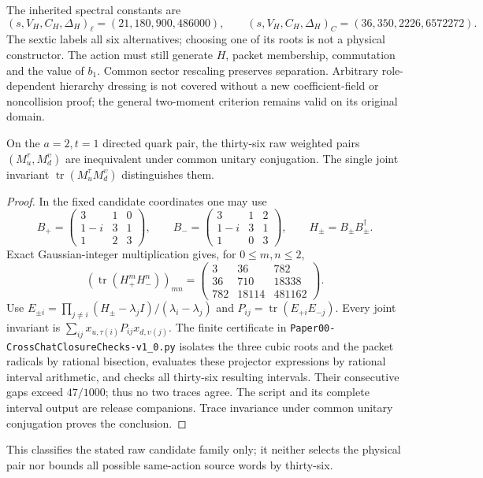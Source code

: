 \documentclass[11pt,a4paper]{article}
\begin{document}
The inherited spectral constants are
\[
 (s,V_H,C_H,\Delta_H)_\ell=(21,180,900,486000),\qquad
 (s,V_H,C_H,\Delta_H)_C=(36,350,2226,6572272).
\]
The sextic labels all six alternatives; choosing one of its roots is not a
physical constructor.  The action must still generate \(H\), packet
membership, commutation and the value of \(b_1\).  Common sector rescaling
preserves separation.  Arbitrary role-dependent hierarchy dressing is not
covered without a new coefficient-field or noncollision proof; the general
two-moment criterion remains valid on its original domain.

\begin{theorem}
\label{p6:thm:v2109-thirtysix-inequivalent}
On the \(a=2,t=1\) directed quark pair, the thirty-six raw weighted pairs
\((M_u^\tau,M_d^\upsilon)\) are inequivalent under common unitary
conjugation.  The single joint invariant
\(\operatorname{tr}(M_u^\tau M_d^\upsilon)\) distinguishes them.
\end{theorem}
\begin{proof}
In the fixed candidate coordinates one may use
\[
 B_+=\begin{pmatrix}3&1&0\\1-i&3&1\\1&2&3\end{pmatrix},\qquad
 B_-=\begin{pmatrix}3&1&2\\1-i&3&1\\1&0&3\end{pmatrix},
 \qquad H_\pm=B_\pm B_\pm^\dagger.
\]
Exact Gaussian-integer multiplication gives, for \(0\le m,n\le2\),
\[
 (\operatorname{tr}(H_+^mH_-^n))_{mn}
 =\begin{pmatrix}3&36&782\\36&710&18338\\782&18114&481162\end{pmatrix}.
\]
Use \(E_{\pm i}=\prod_{j\ne i}(H_\pm-\lambda_jI)/(\lambda_i-\lambda_j)\)
and \(P_{ij}=\operatorname{tr}(E_{+i}E_{-j})\).  Every joint invariant is
\(\sum_{ij}x_{u,\tau(i)}P_{ij}x_{d,\upsilon(j)}\).
The finite certificate in
\texttt{Paper00-CrossChatClosureChecks-v1\_0.py} isolates the three cubic
roots and the packet radicals by rational bisection, evaluates these
projector expressions by rational interval arithmetic, and checks all
thirty-six resulting intervals.  Their consecutive gaps exceed
\(47/1000\); thus no two traces agree.  The script and its complete
interval output are release companions.  Trace invariance under common
unitary conjugation proves the conclusion.
\end{proof}
This classifies the stated raw candidate family only; it neither selects the
physical pair nor bounds all possible same-action source words by thirty-six.
\end{document}
